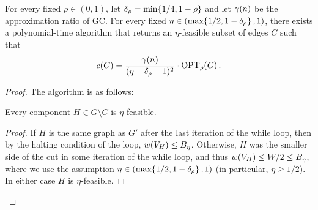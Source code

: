 \begin{theorem}\label{thm:gpd-bicriteria}
    For every fixed $\rho\in(0,1)$, let $\delta_{\rho}=\min\mathopen{}\left\{ 1/4,1-\rho \right\}$ and let $\gamma\mathopen{}\left( n \right)$ be the approximation ratio of GC. For every fixed $\eta\in\mathopen{}\left( \max\mathopen{}\left\{ 1/2,1-\delta_{\rho} \right\},1 \right)$, there exists a polynomial-time algorithm that returns an $\eta$-feasible subset of edges $C$ such that
    \[
    c\mathopen{}\left( C \right)=\frac{\gamma\mathopen{}\left( n \right)}{(\eta+\delta_{\rho}-1)^2}\cdot \textup{OPT}_{\rho}\mathopen{}\left( G \right).
    \]
\end{theorem}
\begin{proof}
    The algorithm is as follows:

    
    \begin{lemma}
    Every component $H\in G\setminus C$ is $\eta$-feasible.
    \end{lemma}
    \begin{proof}
    If $H$ is the same graph as $G'$ after the last iteration of the while loop, then by the halting condition of the loop, $w\mathopen{}\left( V_H \right)\leq B_\eta$. Otherwise, $H$ was the smaller side of the cut in some iteration of the while loop, and thus $w\mathopen{}\left( V_H \right)\leq W/2\leq B_\eta$, where we use the assumption $\eta\in\mathopen{}\left( \max\mathopen{}\left\{ 1/2,1-\delta_{\rho} \right\},1 \right)$ (in particular, $\eta\geq 1/2$). In either case $H$ is $\eta$-feasible.
    \end{proof}


\end{proof}
